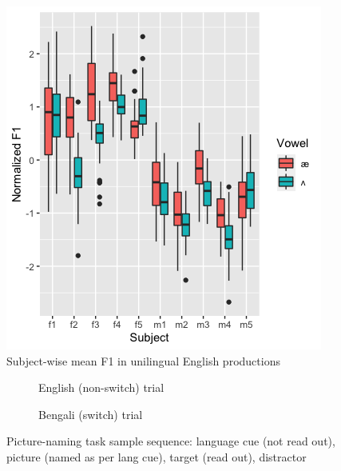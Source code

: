 \documentclass[12 pt]{article}
\begin{document}
\begin{figure}[h] %
	
	\includegraphics[scale=1]{vowel_by_subject_ggplot}
	\caption{Subject-wise mean F1 in unilingual English productions}
	\label{boxplot_F1}
\end{figure}


\newpage

\begin{figure}[!htb] \label{figure_picture_task}
	\centering
	\begin{subfigure}[t]{0.49\textwidth}
		\centering
		
		\caption{English (non-switch) trial} \label{picture_task_english}
	\end{subfigure}
	\begin{subfigure}[t]{0.49\textwidth}
		\centering
		 
		\caption{Bengali (switch) trial} \label{picture_trial_bengali}
	\end{subfigure}
\caption{Picture-naming task sample sequence: language cue (not read out), picture (named as per lang cue), target (read out), distractor}
\end{figure}
\end{document}
